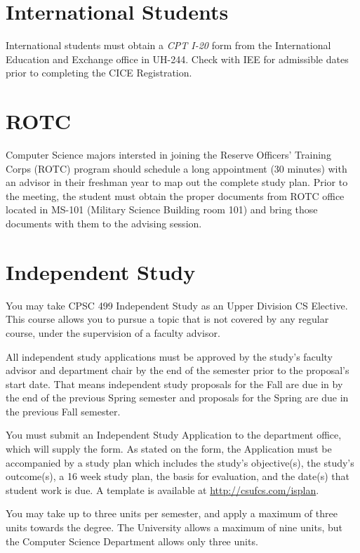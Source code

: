 \documentclass{book}
\newcommand{\shrunkurl}[1]{\url{http://csufcs.com/#1}}
\begin{document}
\section{International Students}

International students must obtain a \emph{CPT I-20} form from the International Education and Exchange office in UH-244. Check with IEE for admissible dates prior to completing the CICE Registration.

\section{ROTC}

Computer Science majors intersted in joining the Reserve Officers' Training
Corps (ROTC) program should schedule a long appointment (30 minutes) with an
advisor in their freshman year to map out the complete study plan.  Prior to
the meeting, the student must obtain the proper documents from ROTC office
located in MS-101 (Military Science Building room 101) and bring those
documents with them to the advising session.

\section{Independent Study}

You may take CPSC 499 Independent Study as an Upper Division CS Elective. This course allows you to pursue a topic that is not covered by any regular course, under the supervision of a faculty advisor.

All independent study applications must be approved by the study's faculty advisor and department chair by the
end of the semester prior to the proposal’s start date. That means independent study proposals for the Fall are due in
by the end of the previous Spring semester and proposals for the Spring are due in the previous Fall semester.

You must submit an Independent Study Application to the department office, which will supply the form. As stated on the form, the Application must be accompanied by a study plan which includes the study's objective(s), the study's outcome(s), a 16 week study plan, the basis for evaluation, and the date(s) that student work is due. A template is available at \shrunkurl{isplan}.

You may take up to three units per semester, and apply a maximum of three units towards the degree. The University allows a maximum of nine units, but the Computer Science Department allows only three units.
\end{document}
